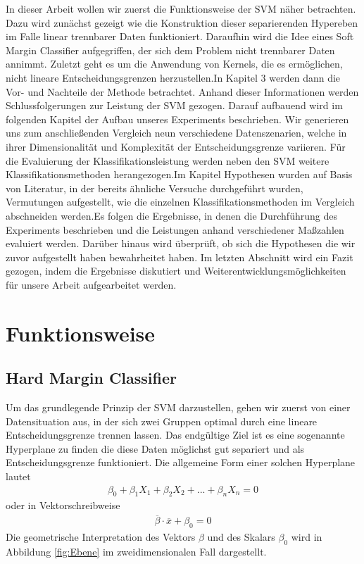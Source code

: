 \documentclass[
]{article}
\begin{document}
In dieser Arbeit wollen wir zuerst die Funktionsweise der SVM näher
betrachten. Dazu wird zunächst gezeigt wie die Konstruktion dieser
separierenden Hypereben im Falle linear trennbarer Daten funktioniert.
Daraufhin wird die Idee eines Soft Margin Classifier aufgegriffen, der
sich dem Problem nicht trennbarer Daten annimmt. Zuletzt geht es um die
Anwendung von Kernels, die es ermöglichen, nicht lineare
Entscheidungsgrenzen herzustellen.\newline In Kapitel 3 werden dann die
Vor- und Nachteile der Methode betrachtet. Anhand dieser Informationen
werden Schlussfolgerungen zur Leistung der SVM gezogen. Darauf aufbauend
wird im folgenden Kapitel der Aufbau unseres Experiments beschrieben.
Wir generieren uns zum anschließenden Vergleich neun verschiedene
Datenszenarien, welche in ihrer Dimensionalität und Komplexität der
Entscheidungsgrenze variieren. Für die Evaluierung der
Klassifikationsleistung werden neben den SVM weitere
Klassifikationsmethoden herangezogen.\newline Im Kapitel Hypothesen
wurden auf Basis von Literatur, in der bereits ähnliche Versuche
durchgeführt wurden, Vermutungen aufgestellt, wie die einzelnen
Klassifikationsmethoden im Vergleich abschneiden werden.\newline Es
folgen die Ergebnisse, in denen die Durchführung des Experiments
beschrieben und die Leistungen anhand verschiedener Maßzahlen evaluiert
werden. Darüber hinaus wird überprüft, ob sich die Hypothesen die wir
zuvor aufgestellt haben bewahrheitet haben. Im letzten Abschnitt wird
ein Fazit gezogen, indem die Ergebnisse diskutiert und
Weiterentwicklungsmöglichkeiten für unsere Arbeit aufgearbeitet werden.

\section{Funktionsweise}

\subsection{Hard Margin Classifier}

Um das grundlegende Prinzip der SVM darzustellen, gehen wir zuerst von
einer Datensituation aus, in der sich zwei Gruppen optimal durch eine
lineare Entscheidungsgrenze trennen lassen. Das endgültige Ziel ist es
eine sogenannte Hyperplane zu finden die diese Daten möglichst gut
separiert und als Entscheidungsgrenze funktioniert. Die allgemeine Form
einer solchen Hyperplane lautet \begin{align}
\beta_0+ \beta_1 X_1+\beta_2 X_2+...+\beta_n X_n=0\label{eq:hyperebene}
\end{align} oder in Vektorschreibweise \begin{align}
\overline{\beta}\cdot\overline{x}+\beta_0=0 \label{eq:hyperplanevec}
\end{align} Die geometrische Interpretation des Vektors \(\beta\) und
des Skalars \(\beta_0\) wird in Abbildung \ref{fig:Ebene} im
zweidimensionalen Fall dargestellt.
\end{document}
